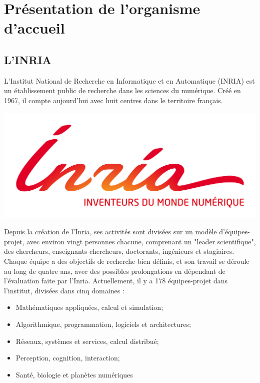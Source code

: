 \section{Présentation de l'organisme d'accueil}
\label{sec:organisme}

\subsection{L'INRIA}
\label{subsec:inria}

\indent L'Institut National de Recherche en Informatique et en Automatique (INRIA) est un établissement public de recherche dans les sciences du numérique. Créé en 1967, il compte aujourd'hui avec huit centres dans le territoire français. 

\begingroup
\centering
\includegraphics[scale=.3]{figures/logos/Inria.jpg}
\endgroup

\indent Depuis la création de l'Inria, ses activités sont divisées sur un modèle d'équipes-projet, avec environ vingt personnes chacune, comprenant un "leader scientifique", des chercheurs, enseignants chercheurs, doctorants, ingénieurs et stagiaires. Chaque équipe a des objectifs de recherche bien définis, et son travail se déroule au long de quatre ans, avec des possibles prolongations en dépendant de l'évaluation faite par l'Inria. Actuellement, il y a 178 équipes-projet dans l'institut, divisées dans cinq domaines : 

\begin{itemize}
	\item Mathématiques appliquées, calcul et simulation;
	\item Algorithmique, programmation, logiciels et architectures;
	\item Réseaux, systèmes et services, calcul distribué;
	\item Perception, cognition, interaction;
	\item Santé, biologie et planètes numériques
\end{itemize}

